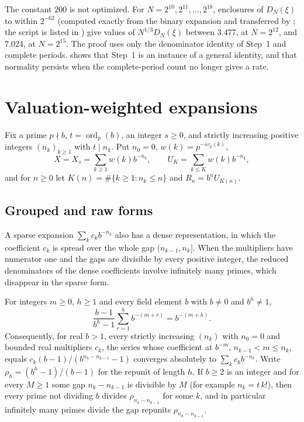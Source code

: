 \documentclass[11pt]{article}
\DeclareMathOperator{\ord}{ord}
\begin{document}
The constant $200$ is not optimized. For $N=2^{10},2^{11},\ldots,2^{18}$, enclosures of $D_N(\xi)$
to within $2^{-62}$ (computed exactly from the binary expansion and transferred by ;
the script is listed in ) give values of $N^{1/3}D_N(\xi)$ between $3.477$, at
$N=2^{12}$, and $7.024$, at $N=2^{15}$. The proof uses only the denominator identity of Step~1 and complete periods.  shows
that Step~1 is an instance of a general identity, and that normality persists when the
complete-period count no longer gives a rate.

\section{Valuation-weighted expansions}\label{sec:switch}

Fix a prime $p\nmid b$, $t=\ord_p(b)$, an integer $s\ge0$, and strictly increasing positive integers
$(n_k)_{k\ge1}$ with $t\mid n_k$. Put $n_0=0$, $w(k)=p^{-sv_p(k)}$,
\[
X=X_s=\sum_{k\ge1}w(k)b^{-n_k},\qquad U_K=\sum_{k\le K}w(k)b^{-n_k},
\]
and for $n\ge0$ let $K(n)=\#\{k\ge1:n_k\le n\}$ and $R_n=b^nU_{K(n)}$.

\subsection{Grouped and raw forms}

A sparse expansion $\sum_kc_kb^{-n_k}$ also has a dense representation, in which the coefficient
$c_k$ is spread over the whole gap $(n_{k-1},n_k]$. When the multipliers have numerator one and the
gaps are divisible by every positive integer, the reduced denominators of the dense coefficients
involve infinitely many primes, which disappear in the sparse form.

\begin{proposition}\label{prop:group}
For integers $m\ge0$, $h\ge1$ and every field element $b$ with $b\ne0$ and $b^h\ne1$,
\[
\frac{b-1}{b^h-1}\sum_{r=1}^{h}b^{-(m+r)}=b^{-(m+h)} .
\]
Consequently, for real $b>1$, every strictly increasing $(n_k)$ with $n_0=0$ and bounded real
multipliers $c_k$, the series whose coefficient at $b^{-m}$, $n_{k-1}<m\le n_k$, equals
$c_k(b-1)/(b^{n_k-n_{k-1}}-1)$ converges absolutely to $\sum_kc_kb^{-n_k}$. Write
$\rho_h=(b^h-1)/(b-1)$ for the repunit of length $h$. If $b\ge2$ is an integer and for every $M\ge1$
some gap $n_k-n_{k-1}$ is divisible by $M$ (for example $n_k=t\,k!$), then every prime not dividing $b$
divides $\rho_{n_k-n_{k-1}}$ for some $k$, and in particular infinitely many primes divide the gap
repunits $\rho_{n_k-n_{k-1}}$.
\end{proposition}
\end{document}
